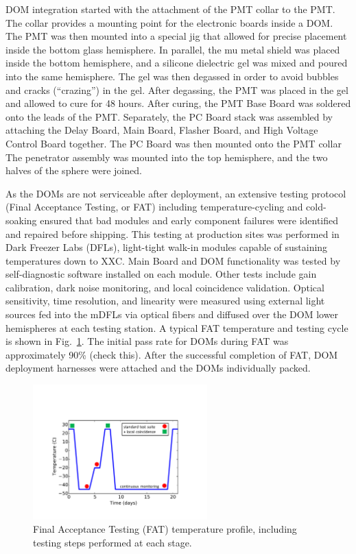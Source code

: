 DOM integration started with the attachment of the PMT collar
to the PMT.  The collar provides a mounting point for the electronic boards inside
a DOM. The PMT was then mounted into a special jig that allowed for precise
placement inside the bottom glass hemisphere.  In parallel, the mu metal
shield was placed inside the bottom hemisphere, and a silicone dielectric
gel was mixed and poured into the same hemisphere. The gel was then
degassed in order to avoid bubbles and cracks (``crazing'') in the gel.
After degassing, the PMT was placed in the gel and allowed to cure for 48
hours.  After curing, the PMT Base Board was soldered onto the leads of the
PMT.  Separately, the PC Board stack was assembled by attaching the Delay
Board, Main Board, Flasher Board, and High Voltage Control Board together.
The PC Board was then mounted onto the PMT collar The penetrator assembly
was mounted into the top hemisphere, and the two halves of the sphere were
joined. 

As the DOMs are not serviceable after deployment, an extensive testing
protocol (Final Acceptance Testing, or FAT) including temperature-cycling
and cold-soaking ensured that bad modules and early component failures were
identified and repaired before shipping.  This testing at production sites
was performed in Dark Freezer Labs (DFLs), light-tight walk-in 
modules capable of sustaining temperatures down to XXC.  Main Board
and DOM functionality was tested by self-diagnostic software installed on
each module.  Other tests include gain calibration, dark noise monitoring,
and local coincidence validation.  Optical sensitivity, time resolution,
and linearity were measured using external light sources fed into the mDFLs
via optical fibers and diffused over the DOM lower hemispheres at each
testing station.  A typical FAT temperature and testing cycle is shown in
Fig.~\ref{fig:fat_cycle}. The initial pass rate for DOMs during FAT 
was approximately 90\% (check this).  After the successful completion of
FAT, DOM deployment harnesses were attached and the DOMs individually
packed.


\begin{figure}[!h]
 \centering
 \includegraphics[width=0.6\textwidth]{graphics/dom/production/fat_cycle.pdf}
 \caption{Final Acceptance Testing (FAT) temperature profile, including
   testing steps performed at each stage.}
 \label{fig:fat_cycle}
\end{figure}

